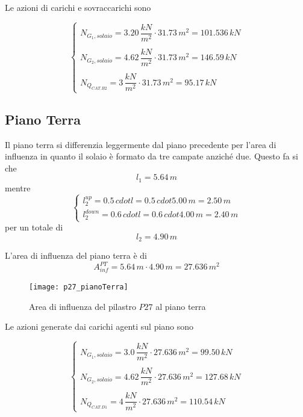 Le azioni di carichi e sovraccarichi sono

\begin{equation*}
	\begin{cases}
		N_{G_1, solaio} = 3.20\,\dfrac{kN}{m^2}\cdot31.73\,m^2 = 101.536\,kN\\\\
		N_{G_2, solaio} = 4.62\,\dfrac{kN}{m^2}\cdot31.73\,m^2 = 146.59\,kN\\\\
		N_{Q_{CAT.B2}} = 3\,\dfrac{kN}{m^2}\cdot 31.73\,m^2 = 95.17\,kN
	\end{cases}
\end{equation*}

\subsection{Piano Terra}
Il piano terra si differenzia leggermente dal piano precedente per l'area di influenza in quanto il solaio è formato da tre campate anziché due. Questo fa si che
\[
	l_1 = 5.64\,m
\]
mentre 
\[
	\begin{cases}
		l_2^{up} = 0.5\,cdot l = 0.5\,cdot 5.00\,m = 2.50\,m\\
		l_2^{down} = 0.6\,cdot l = 0.6\,cdot 4.00\,m = 2.40\,m
	\end{cases}
\]
per un totale di 
\[
	l_2 = 4.90\,m
\]

L'area di influenza del piano terra è di 
\[
	A_{inf}^{PT} = 5.64\,m \cdot 4.90\,m = 27.636\,m^2
\]

\begin{figure}
	\centering
	\texttt{[image: p27\_pianoTerra]}
	\caption{Area di influenza del pilastro $P27$ al piano terra}
	\label{fig:infAreaPianoTerra}
\end{figure}

Le azioni generate dai carichi agenti sul piano sono

\begin{equation*}
	\begin{cases}
		N_{G_1, solaio} = 3.0\,\dfrac{kN}{m^2}\cdot27.636\,m^2 = 99.50\,kN\\\\
		N_{G_2, solaio} = 4.62\,\dfrac{kN}{m^2}\cdot27.636\,m^2 = 127.68\,kN\\\\
		N_{Q_{CAT.D1}} = 4\,\dfrac{kN}{m^2}\cdot 27.636\,m^2 = 110.54\,kN
	\end{cases}
\end{equation*}

